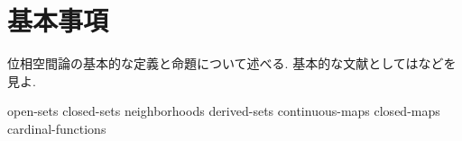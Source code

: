 \documentclass[uplatex, dvipdfmx, a4paper, 12pt, class=jsbook, crop=false]{standalone}
\begin{document}
\chapter{基本事項}
\label{chap:basics}

位相空間論の基本的な定義と命題について述べる.
基本的な文献としては\cite{Engelking1989GT, Dugundji1966T, Morita1981ja, KodamaNagami1974ja}などを見よ.

{open-sets}
{closed-sets}
{neighborhoods}
{derived-sets}
{continuous-maps}
{closed-maps}
{cardinal-functions}
\end{document}
